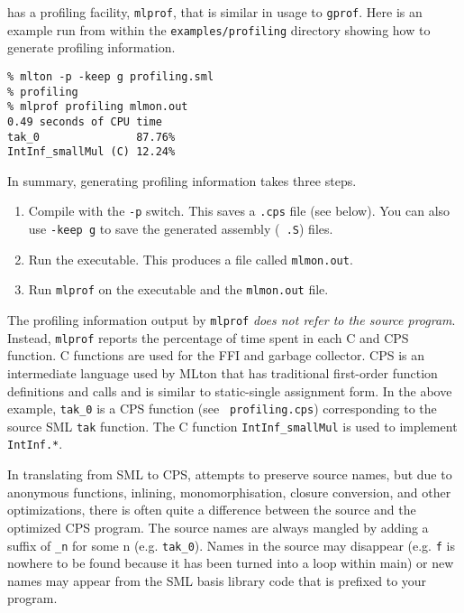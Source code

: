 
{\mlton} has a profiling facility, {\tt mlprof}, that is similar in usage
to {\tt gprof}.  Here is an example run from within the {\tt examples/profiling}
directory showing how to generate profiling information.

\begin{verbatim}
% mlton -p -keep g profiling.sml
% profiling
% mlprof profiling mlmon.out
0.49 seconds of CPU time
tak_0               87.76%
IntInf_smallMul (C) 12.24%
\end{verbatim}
In summary, generating profiling information takes three steps.
\begin{enumerate}

\item Compile with the {\tt -p} switch.  This saves a {\tt .cps} file (see
below).  You can also use {\tt -keep g} to save the generated assembly ({\tt
.S}) files.

\item Run the executable.  This produces a file called {\tt mlmon.out}.

\item Run {\tt mlprof} on the executable and the {\tt mlmon.out} file.

\end{enumerate}
The profiling information output by {\tt mlprof} {\em does not refer to the
source program}.  Instead, {\tt mlprof} reports the percentage of time spent in
each C and CPS function.  C functions are used for the FFI and garbage
collector.  CPS is an intermediate language used by MLton that has traditional
first-order function definitions and calls and is similar to static-single
assignment form.  In the above example, {\tt tak\_0} is a CPS function (see {\tt
profiling.cps}) corresponding to the source SML {\tt tak} function.  The C
function {\tt IntInf\_smallMul} is used to implement {\tt IntInf.*}.

In translating from SML to CPS, {\mlton} attempts to preserve source names, but
due to anonymous functions, inlining, monomorphisation, closure conversion, and
other optimizations, there is often quite a difference between the source and
the optimized CPS program.  The source names are always mangled by adding a
suffix of {\tt \_n} for some n (e.g. {\tt tak\_0}).  Names in the source may
disappear (e.g. {\tt f} is nowhere to be found because it has been turned into a
loop within main) or new names may appear from the SML basis library code that
is prefixed to your program.

